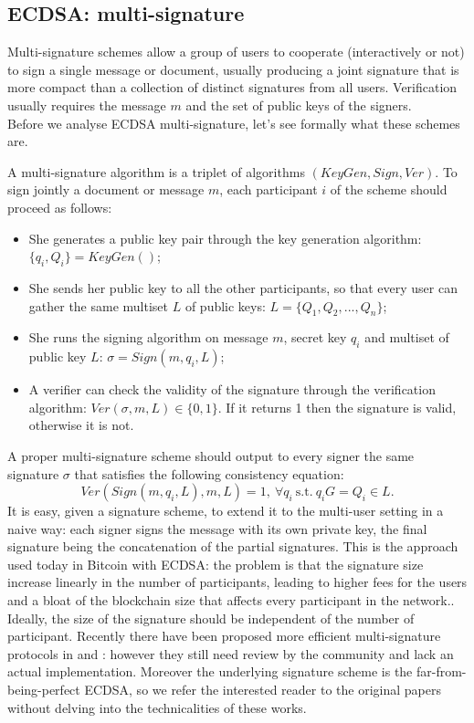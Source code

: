 \bigskip

\subsection{ECDSA: multi-signature}
Multi-signature schemes allow a group of users to cooperate (interactively or not) to sign a single message or document, usually producing a joint signature that is more compact than a collection of distinct signatures from all users. Verification usually requires the message $m$ and the set of public keys of the signers.
\\
Before we analyse ECDSA multi-signature, let's see formally what these schemes are.

\bigskip
\noindent
A multi-signature algorithm is a triplet of algorithms $(KeyGen, Sign, Ver)$. To sign jointly a document or message $m$, each participant $i$ of the scheme should proceed as follows:
\begin{itemize}
	\item She generates a public key pair through the key generation algorithm: $\{q_i, Q_i\} = KeyGen()$;
	\item She sends her public key to all the other participants, so that every user can gather the same multiset $L$ of public keys: $L = \{Q_1, Q_2, ..., Q_n\}$;
	\item She runs the signing algorithm on message $m$, secret key $q_i$ and multiset of public key $L$: $\sigma = Sign(m, q_i, L)$;
	\item A verifier can check the validity of the signature through the verification algorithm: $Ver(\sigma, m, L) \in \{0, 1\}$. If it returns 1 then the signature is valid, otherwise it is not.
\end{itemize}
A proper multi-signature scheme should output to every signer the same signature $\sigma$ that satisfies the following consistency equation: 
$$Ver(Sign(m, q_i, L), m, L) = 1, \ \forall q_i \ \text{s.t.} \ q_iG = Q_i \in L.$$
It is easy, given a signature scheme, to extend it to the multi-user setting in a naive way: each signer signs the message with its own private key, the final signature being the concatenation of the partial signatures. This is the approach used today in Bitcoin with ECDSA: the problem is that the signature size increase linearly in the number of participants, leading to higher fees for the users and a bloat of the blockchain size that affects every participant in the network.. Ideally, the size of the signature should be independent of the number of participant. Recently there have been proposed more efficient multi-signature protocols in \cite{ECDSA1} and \cite{ECDSA2}: however they still need review by the community and lack an actual implementation. Moreover the underlying signature scheme is the far-from-being-perfect ECDSA, so we refer the interested reader to the original papers without delving into the technicalities of these works.

